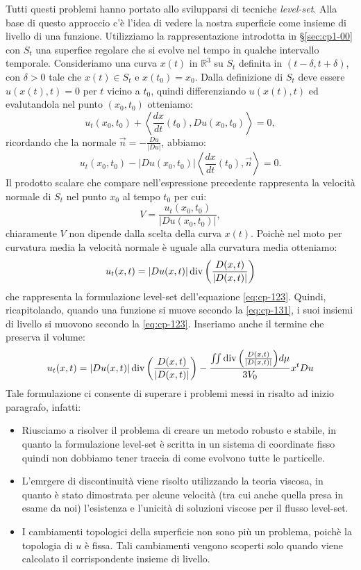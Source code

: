 Tutti questi problemi hanno portato allo svilupparsi di tecniche \emph{level-set}. Alla base di questo approccio c'è l'idea di vedere la nostra superficie come  insieme di livello di una funzione. Utilizziamo la rappresentazione introdotta in §\ref{sec:cp1-00} con $S_t$ una superfice regolare che si evolve nel tempo in qualche intervallo temporale. Consideriamo una curva $x(t)$ in $\mathbb{R}^3$ su $S_t$ definita in $(t-\delta,t+\delta)$, con $\delta>0$ tale che $x(t)\in S_t$ e $x(t_0)=x_0$. Dalla definizione di $S_t$ deve essere $u(x(t),t)=0$ per $t$ vicino a $t_0$, quindi differenziando  $u(x(t),t)$ ed evalutandola nel punto $(x_0,t_0)$ otteniamo:
\[
u_t(x_0,t_0)+\left<\frac{dx}{dt}(t_0),Du(x_0,t_0)\right>=0,
\]
ricordando che la normale $\vec{n}=-\frac{Du}{|Du|}$, abbiamo:
\[
u_t(x_0,t_0)-|Du(x_0,t_0)|\left<\frac{dx}{dt}(t_0),\vec{n}\right>=0.
\]
Il prodotto scalare che compare nell'espressione precedente rappresenta la velocità normale di $S_t$ nel punto $x_0$ al tempo $t_0$ per cui: 
\[
V=\frac{u_t(x_0,t_0)}{|Du(x_0,t_0)|},
\]
chiaramente  $V$ non dipende dalla scelta della curva $x(t)$. Poichè nel moto per curvatura media la velocità normale è uguale alla curvatura media otteniamo:
\begin{equation}
  \label{eq:cp-131}
  u_t(x,t)=|Du(x,t)|\operatorname{div}{\left(\frac{D(x,t)}{|D(x,t)|}\right)}
\end{equation}
che rappresenta la formulazione level-set dell'equazione \eqref{eq:cp-123}. 
Quindi, ricapitolando, quando una funzione si muove secondo la \eqref{eq:cp-131}, i suoi insiemi di livello si muovono secondo la \eqref{eq:cp-123}. Inseriamo anche il termine che preserva il volume:
\begin{equation}
  \label{eq:cp-132}
  u_t(x,t)=|Du(x,t)|\operatorname{div}{\left(\frac{D(x,t)}{|D(x,t)|}\right)}-\frac{\iint\operatorname{div}{\left(\frac{D(x,t)}{|D(x,t)|}\right)}d\mu}{3V_0}x^tDu
\end{equation}
 Tale formulazione ci consente di superare i problemi messi in risalto ad inizio paragrafo, infatti:
\begin{itemize}
  \item Riusciamo a risolver il problema di creare un metodo robusto e stabile, in quanto la formulazione level-set è scritta in un sistema di coordinate fisso quindi non dobbiamo tener traccia di come evolvono tutte le particelle.

  \item L'emrgere di discontinuità viene risolto utilizzando la teoria viscosa, in quanto è stato dimostrata per alcune velocità (tra cui anche quella presa in esame da noi) l'esistenza e l'unicità di soluzioni viscose per il flusso level-set.

   \item I cambiamenti topologici della superficie non sono più un problema, poichè la topologia di $u$ è fissa. Tali cambiamenti vengono scoperti solo quando viene calcolato il corrispondente insieme di livello. 

\end{itemize}
